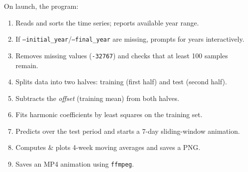 \documentclass[11pt,a4paper]{article}
\begin{document}
On launch, the program:
\begin{enumerate}[leftmargin=1.5em]
  \item Reads and sorts the time series; reports available year range.
  \item If \texttt{--initial\_year}/\texttt{--final\_year} are missing, prompts for years interactively.
  \item Removes missing values (\texttt{-32767}) and checks that at least 100 samples remain.
  \item Splits data into two halves: training (first half) and test (second half).
  \item Subtracts the \emph{offset} (training mean) from both halves.
  \item Fits harmonic coefficients by least squares on the training set.
  \item Predicts over the test period and starts a 7-day sliding-window animation.
  \item Computes \& plots 4-week moving averages and saves a PNG.
  \item Saves an MP4 animation using \texttt{ffmpeg}.
\end{enumerate}
\end{document}
